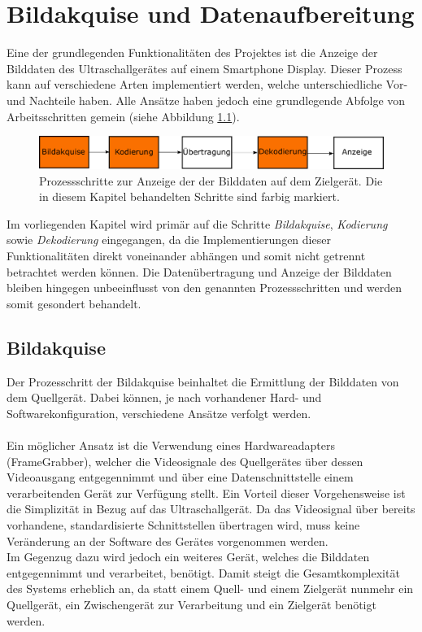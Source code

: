 \chapter{Bildakquise und Datenaufbereitung}
Eine der grundlegenden Funktionalitäten des Projektes ist die Anzeige der Bilddaten des Ultraschallgerätes auf einem Smartphone Display. Dieser Prozess kann auf verschiedene Arten implementiert werden, welche unterschiedliche Vor- und Nachteile haben. Alle Ansätze haben jedoch eine grundlegende Abfolge von Arbeitsschritten gemein (siehe Abbildung \ref{fig:Bildakquise_schritte}).\\

\begin{figure}[h]
	\centering
	\includegraphics[width=1\textwidth]{Bilder/BildakquiseUndDatenaufbereitung/Bildakquise_schritte.pdf}
	\caption{Prozessschritte zur Anzeige der der Bilddaten auf dem Zielgerät. Die in diesem Kapitel behandelten Schritte sind farbig markiert.}
	\label{fig:Bildakquise_schritte}
\end{figure}

Im vorliegenden Kapitel wird primär auf die Schritte \textit{Bildakquise}, \textit{Kodierung} sowie \textit{Dekodierung} eingegangen, da die Implementierungen dieser Funktionalitäten direkt voneinander abhängen und somit nicht getrennt betrachtet werden können. Die Datenübertragung und Anzeige der Bilddaten bleiben hingegen unbeeinflusst von den genannten Prozessschritten und werden somit gesondert behandelt.\\

\section{Bildakquise}
Der Prozesschritt der Bildakquise beinhaltet die Ermittlung der Bilddaten von dem Quellgerät. Dabei können, je nach vorhandener Hard- und Softwarekonfiguration, verschiedene Ansätze verfolgt werden.\\
\\
Ein möglicher Ansatz ist die Verwendung eines Hardwareadapters (\glqq FrameGrabber\grqq), welcher die Videosignale des Quellgerätes über dessen Videoausgang entgegennimmt und über eine Datenschnittstelle einem verarbeitenden Gerät zur Verfügung stellt. Ein Vorteil dieser Vorgehensweise ist die Simplizität in Bezug auf das Ultraschallgerät. Da das Videosignal über bereits vorhandene, standardisierte Schnittstellen übertragen wird, muss keine Veränderung an der Software des Gerätes vorgenommen werden.\\
Im Gegenzug dazu wird jedoch ein weiteres Gerät, welches die Bilddaten entgegennimmt und verarbeitet, benötigt. Damit steigt die Gesamtkomplexität des Systems erheblich an, da statt einem Quell- und einem Zielgerät nunmehr ein Quellgerät, ein Zwischengerät zur Verarbeitung und ein Zielgerät benötigt werden.\\

